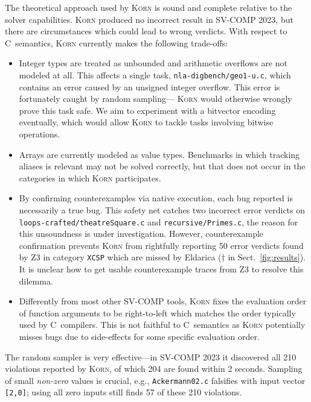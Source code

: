 \documentclass{llncs}
\newcommand{\Korn}{\textsc{Korn}\xspace}
\begin{document}
The theoretical approach used by \Korn is sound and complete
relative to the solver capabilities.
\Korn produced no incorrect result in SV-COMP 2023,
but there are circumstances which could lead to wrong verdicts.
With respect to C~semantics, \Korn currently makes the following trade-offs:
\begin{itemize}
\item Integer types are treated as unbounded and arithmetic overflows are not modeled at all.
 This affects a single task, \texttt{nla-digbench/geo1-u.c},
 which contains an error caused by an unsigned integer overflow.
 This error is fortunately caught by random sampling---
 \Korn would otherwise wrongly prove this task safe.
 We aim to experiment with a bitvector encoding eventually,
 which would allow \Korn to tackle tasks involving bitwise operations.
\item Arrays are currently modeled as value types.
 Benchmarks in which tracking aliases is relevant
 may not be solved correctly, but that does not occur in the categories in which \Korn participates.
\item By confirming counterexamples via native execution,
 each bug reported is necessarily a true bug.
 This safety net catches two incorrect error verdicts
 on
 \texttt{loops-crafted/theatreSquare.c} and \texttt{recursive/Primes.c},
 the reason for this unsoundness is under investigation.
 However, counterexample confirmation prevents \Korn from rightfully reporting 50 error verdicts found by Z3 in category \texttt{XCSP}
 which are missed by Eldarica ($\dagger$ in Sect.~\ref{fig:results}).
 It is unclear how to get usable counterexample traces from Z3 to resolve this dilemma.
\item
 Differently from most other SV-COMP tools, \Korn fixes the evaluation order of function arguments to be right-to-left
 which matches the order typically used by C~compilers.
 This is not faithful to C~semantics as \Korn potentially misses bugs due to side-effects
 for some specific evaluation order.
\end{itemize}

The random sampler is very effective---in SV-COMP 2023 it discovered
all 210 violations reported by \Korn, of which 204 are found within 2 seconds.
Sampling of small \emph{non-zero} values is crucial, e.g., \texttt{Ackermann02.c}
falsifies with input vector \texttt{[2,0]};
using all zero inputs still finds 57 of these 210 violations.
\end{document}
